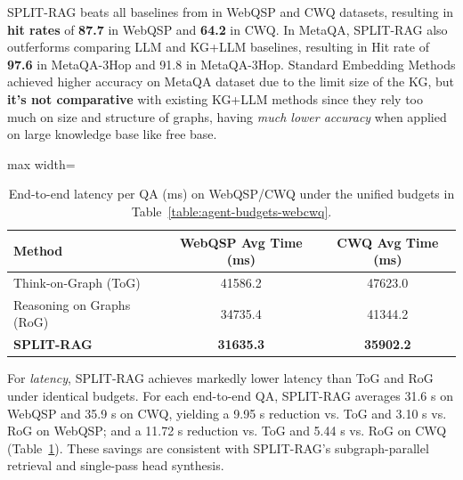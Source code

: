 \documentclass[sigconf]{acmart}
\begin{document}

SPLIT-RAG beats all baselines from in WebQSP and CWQ datasets, resulting in \textbf{hit rates} of \textbf{87.7} in WebQSP and \textbf{64.2} in CWQ. In MetaQA, SPLIT-RAG also outferforms comparing LLM and KG+LLM baselines, resulting in Hit rate of \textbf{97.6} in MetaQA-3Hop and 91.8 in MetaQA-3Hop. Standard Embedding Methods achieved higher accuracy on MetaQA dataset due to the limit size of the KG, but \textbf{it's not comparative} with existing KG+LLM methods since they rely too much on size and structure of graphs, having \textit{much lower accuracy} when applied on large knowledge base like free base.

\begin{table}[t]
  \centering
  \caption{End-to-end latency per QA (ms) on WebQSP/CWQ under the unified budgets in Table~\ref{table:agent-budgets-webcwq}.}
  \label{tab:latency_tog_rog_split}
  \vspace{-1mm}
  \begin{adjustbox}{max width=\columnwidth}
  \begin{tabular}{l|cc}
    \toprule
    Method & WebQSP Avg Time (ms) & CWQ Avg Time (ms) \\
    \midrule
    Think-on-Graph (ToG) & 41586.2 & 47623.0 \\
    Reasoning on Graphs (RoG) & 34735.4 & 41344.2 \\
    \textbf{SPLIT-RAG} & \textbf{31635.3} & \textbf{35902.2} \\
    \bottomrule
  \end{tabular}
  \end{adjustbox}
  \vspace{-2mm}
\end{table}




For \emph{latency}, SPLIT-RAG achieves markedly lower latency than ToG and RoG under identical budgets. For each end-to-end QA, SPLIT-RAG averages 31.6 s on WebQSP and 35.9 s on CWQ, yielding a 9.95 s reduction vs. ToG and 3.10 s vs. RoG on WebQSP; and a 11.72 s reduction vs. ToG and 5.44 s vs. RoG on CWQ (Table~\ref{tab:latency_tog_rog_split}). These savings are consistent with SPLIT-RAG’s subgraph-parallel retrieval and single-pass head synthesis.
\end{document}
